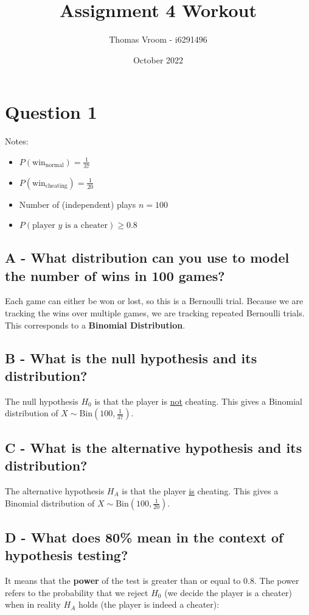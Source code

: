 \documentclass[12pt]{article}
\title{Assignment 4 Workout}
\author{Thomas Vroom - i6291496}
\date{October 2022}
\begin{document}
\maketitle
{}

\section*{Question 1}
Notes:

\begin{itemize}
    \item $P(\text{win}_{\text{normal}}) = \frac{1}{37}$
    \item $P(\text{win}_{\text{cheating}}) = \frac{1}{20}$
    \item Number of (independent) plays $n = 100$
    \item $P(\text{player } y \text{ is a cheater}) \geq 0.8$
\end{itemize}

\subsection*{A - What distribution can you use to model the number of wins in 100 games?}
Each game can either be won or lost, so this is a Bernoulli trial.
Because we are tracking the wins over multiple games, we are tracking repeated Bernoulli trials.
This corresponds to a \textbf{Binomial Distribution}.

\subsection*{B - What is the null hypothesis and its distribution?}
The null hypothesis $H_0$ is that the player is \underline{not} cheating.
This gives a Binomial distribution of $X \sim \text{Bin}(100, \frac{1}{37})$.

\subsection*{C - What is the alternative hypothesis and its \\distribution?}
The alternative hypothesis $H_A$ is that the player \underline{is} cheating.
This gives a Binomial distribution of $X \sim \text{Bin}(100, \frac{1}{20})$.

\subsection*{D - What does 80\% mean in the context of hypothesis testing?}
It means that the \textbf{power} of the test is greater than or equal to 0.8.
The power refers to the probability that we reject $H_0$ (we decide the player is a cheater) when in reality $H_A$ holds (the player is indeed a cheater):
\end{document}
